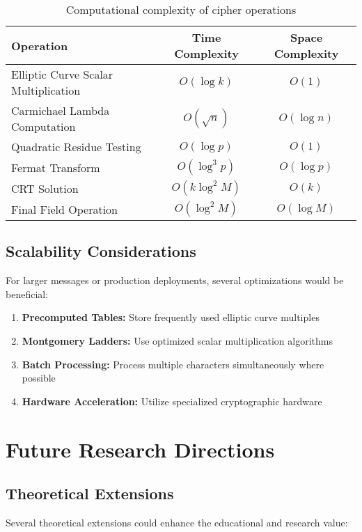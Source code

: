 \documentclass[12pt,a4paper]{article}
\begin{document}
\begin{table}[h]
\centering
\begin{tabular}{|l|c|c|}
\hline
\textbf{Operation} & \textbf{Time Complexity} & \textbf{Space Complexity} \\
\hline
Elliptic Curve Scalar Multiplication & $O(\log k)$ & $O(1)$ \\
Carmichael Lambda Computation & $O(\sqrt{n})$ & $O(\log n)$ \\
Quadratic Residue Testing & $O(\log p)$ & $O(1)$ \\
Fermat Transform & $O(\log^3 p)$ & $O(\log p)$ \\
CRT Solution & $O(k \log^2 M)$ & $O(k)$ \\
Final Field Operation & $O(\log^2 M)$ & $O(\log M)$ \\
\hline
\end{tabular}
\caption{Computational complexity of cipher operations}
\end{table}

\subsection{Scalability Considerations}

For larger messages or production deployments, several optimizations would be beneficial:

\begin{enumerate}
    \item \textbf{Precomputed Tables:} Store frequently used elliptic curve multiples
    \item \textbf{Montgomery Ladders:} Use optimized scalar multiplication algorithms
    \item \textbf{Batch Processing:} Process multiple characters simultaneously where possible
    \item \textbf{Hardware Acceleration:} Utilize specialized cryptographic hardware
\end{enumerate}

\section{Future Research Directions}

\subsection{Theoretical Extensions}

Several theoretical extensions could enhance the educational and research value:
\end{document}
